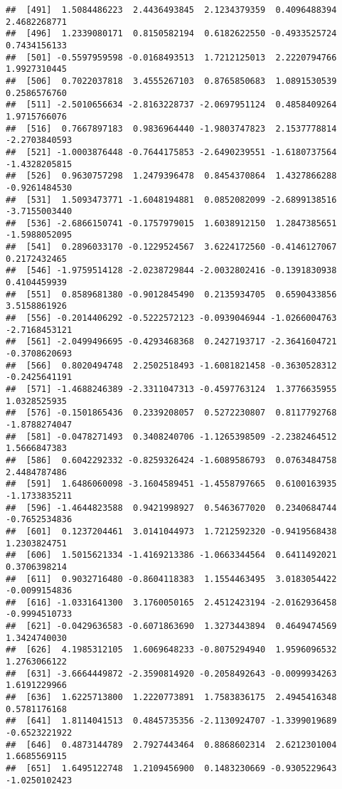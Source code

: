 \documentclass[
]{article}
\begin{document}
\begin{verbatim}
##  [491]  1.5084486223  2.4436493845  2.1234379359  0.4096488394  2.4682268771
##  [496]  1.2339080171  0.8150582194  0.6182622550 -0.4933525724  0.7434156133
##  [501] -0.5597959598 -0.0168493513  1.7212125013  2.2220794766  1.9927310445
##  [506]  0.7022037818  3.4555267103  0.8765850683  1.0891530539  0.2586576760
##  [511] -2.5010656634 -2.8163228737 -2.0697951124  0.4858409264  1.9715766076
##  [516]  0.7667897183  0.9836964440 -1.9803747823  2.1537778814 -2.2703840593
##  [521] -1.0003876448 -0.7644175853 -2.6490239551 -1.6180737564 -1.4328205815
##  [526]  0.9630757298  1.2479396478  0.8454370864  1.4327866288 -0.9261484530
##  [531]  1.5093473771 -1.6048194881  0.0852082099 -2.6899138516 -3.7155003440
##  [536] -2.6866150741 -0.1757979015  1.6038912150  1.2847385651 -1.5988052095
##  [541]  0.2896033170 -0.1229524567  3.6224172560 -0.4146127067  0.2172432465
##  [546] -1.9759514128 -2.0238729844 -2.0032802416 -0.1391830938  0.4104459939
##  [551]  0.8589681380 -0.9012845490  0.2135934705  0.6590433856  3.5158861926
##  [556] -0.2014406292 -0.5222572123 -0.0939046944 -1.0266004763 -2.7168453121
##  [561] -2.0499496695 -0.4293468368  0.2427193717 -2.3641604721 -0.3708620693
##  [566]  0.8020494748  2.2502518493 -1.6081821458 -0.3630528312 -0.2425641191
##  [571] -1.4688246389 -2.3311047313 -0.4597763124  1.3776635955  1.0328525935
##  [576] -0.1501865436  0.2339208057  0.5272230807  0.8117792768 -1.8788274047
##  [581] -0.0478271493  0.3408240706 -1.1265398509 -2.2382464512  1.5666847383
##  [586]  0.6042292332 -0.8259326424 -1.6089586793  0.0763484758  2.4484787486
##  [591]  1.6486060098 -3.1604589451 -1.4558797665  0.6100163935 -1.1733835211
##  [596] -1.4644823588  0.9421998927  0.5463677020  0.2340684744 -0.7652534836
##  [601]  0.1237204461  3.0141044973  1.7212592320 -0.9419568438  1.2303824751
##  [606]  1.5015621334 -1.4169213386 -1.0663344564  0.6411492021  0.3706398214
##  [611]  0.9032716480 -0.8604118383  1.1554463495  3.0183054422 -0.0099154836
##  [616] -1.0331641300  3.1760050165  2.4512423194 -2.0162936458 -0.9994510733
##  [621] -0.0429636583 -0.6071863690  1.3273443894  0.4649474569  1.3424740030
##  [626]  4.1985312105  1.6069648233 -0.8075294940  1.9596096532  1.2763066122
##  [631] -3.6664449872 -2.3590814920 -0.2058492643 -0.0099934263  1.6191229966
##  [636]  1.6225713800  1.2220773891  1.7583836175  2.4945416348  0.5781176168
##  [641]  1.8114041513  0.4845735356 -2.1130924707 -1.3399019689 -0.6523221922
##  [646]  0.4873144789  2.7927443464  0.8868602314  2.6212301004  1.6685569115
##  [651]  1.6495122748  1.2109456900  0.1483230669 -0.9305229643 -1.0250102423

\end{verbatim}
\end{document}

